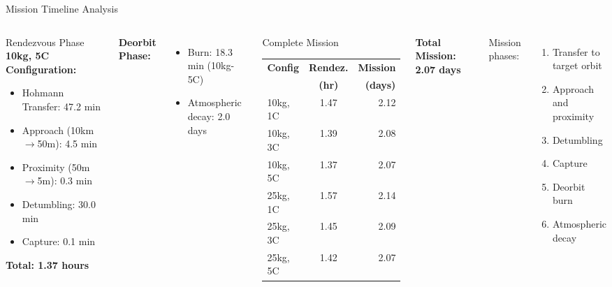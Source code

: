 \documentclass[aspectratio=169]{beamer}
\begin{document}
\begin{frame}{Mission Timeline Analysis}
\begin{columns}[t]
\begin{block}{Rendezvous Phase}
\textbf{10kg, 5C Configuration:}
\begin{itemize}
    \item Hohmann Transfer: 47.2 min
    \item Approach (10km$\rightarrow$50m): 4.5 min
    \item Proximity (50m$\rightarrow$5m): 0.3 min
    \item Detumbling: 30.0 min
    \item Capture: 0.1 min
\end{itemize}
\textbf{Total: 1.37 hours}
\end{block}

\vspace{0.3cm}

\textbf{Deorbit Phase:}
\begin{itemize}
    \item Burn: 18.3 min (10kg-5C)
    \item Atmospheric decay: 2.0 days
\end{itemize}

\begin{block}{Complete Mission}
\begin{table}
\tiny
\begin{tabular}{lcr}
\toprule
\textbf{Config} & \textbf{Rendez.} & \textbf{Mission} \\
 & \textbf{(hr)} & \textbf{(days)} \\
\midrule
10kg, 1C & 1.47 & 2.12 \\
10kg, 3C & 1.39 & 2.08 \\
10kg, 5C & 1.37 & 2.07 \\
25kg, 1C & 1.57 & 2.14 \\
25kg, 3C & 1.45 & 2.09 \\
25kg, 5C & 1.42 & 2.07 \\
\bottomrule
\end{tabular}
\end{table}
\end{block}

\textbf{Total Mission: 2.07 days}

\vspace{0.2cm}

Mission phases:
\begin{enumerate}
    \item Transfer to target orbit
    \item Approach and proximity
    \item Detumbling
    \item Capture
    \item Deorbit burn
    \item Atmospheric decay
\end{enumerate}
\end{columns}
\end{frame}
\end{document}
